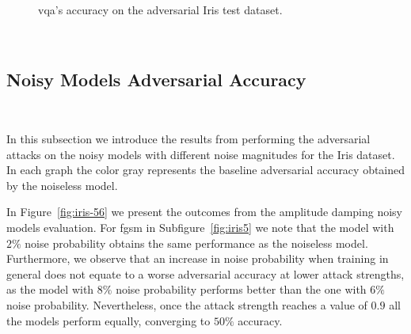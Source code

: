 \begin{figure}[!h]
  \caption{\ac{vqa}'s accuracy on the adversarial Iris test dataset.}
  \label{fig:iris-34}
\end{figure} \

\subsection{Noisy Models Adversarial Accuracy}\label{subsection:iris-noisy-adv-acc} \

In this subsection we introduce the results from performing
the adversarial attacks on the noisy models with different noise
magnitudes for the Iris dataset. In each graph the color gray
represents the baseline adversarial accuracy obtained by the
noiseless model. \

In Figure~\ref{fig:iris-56} we present the outcomes from the amplitude
damping noisy models evaluation. For \ac{fgsm} in Subfigure~\ref{fig:iris5}
we note that the model with \(2\%\) noise probability obtains the same
performance as the noiseless model. Furthermore, we observe that an
increase in noise probability when training in general does not equate
to a worse adversarial accuracy at lower attack strengths, as the model
with \(8\%\) noise probability performs better than the one with \(6\%\)
noise probability. Nevertheless, once the attack strength reaches a
value of \(0.9\) all the models perform equally, converging to \(50\%\)
accuracy. \

